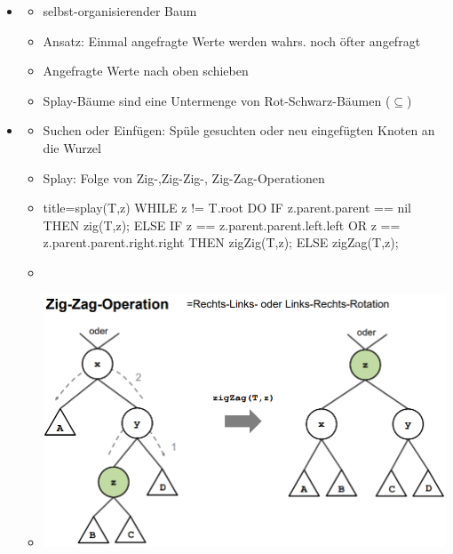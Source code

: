 \documentclass[
    12pt,
    a4paper,
    ngerman,
    color=3b,%
    marginpar=false,
    colorback=false,
    leqno,
]{tudaexercise}
\begin{document}
    \begin{itemize}
        \item {}
            \begin{itemize}
                \item selbst-organisierender Baum
                \item Ansatz: Einmal angefragte Werte werden wahrs. noch öfter angefragt
                \item Angefragte Werte nach oben schieben
                \item Splay-Bäume sind eine Untermenge von Rot-Schwarz-Bäumen ($\subseteq$)
            \end{itemize}
        
        \item {}
            \begin{itemize}
                \item Suchen oder Einfügen: Spüle gesuchten oder neu eingefügten Knoten an die Wurzel
                \item Splay: Folge von Zig-,Zig-Zig-, Zig-Zag-Operationen
                \item []
                    \begin{ccode}[autogobble]{title={splay(T,z)}}
                    WHILE z != T.root DO
                        IF z.parent.parent == nil THEN
                            zig(T,z);
                        ELSE
                            IF z == z.parent.parent.left.left OR
                               z == z.parent.parent.right.right THEN
                               zigZig(T,z);
                            ELSE
                                zigZag(T,z);
                    \end{ccode}
                \item[]
                \item[] \includegraphics[width=12cm]{pictures/zigzag.PNG}

\end{itemize}
\end{itemize}
\end{document}
